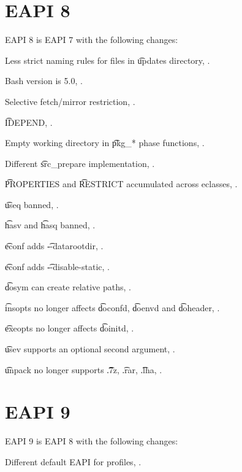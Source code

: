 \section*{EAPI 8}

EAPI 8 is EAPI 7 with the following changes:

\begin{compactitem}
\item Less strict naming rules for files in \t{updates} directory, .
\item Bash version is 5.0, .
\item Selective fetch/mirror restriction, .
\item \t{IDEPEND}, .
\item Empty working directory in \t{pkg_*} phase functions, .
\item Different \t{src_prepare} implementation, .
\item \t{PROPERTIES} and \t{RESTRICT} accumulated across eclasses, .
\item \t{useq} banned, .
\item \t{hasv} and \t{hasq} banned, .
\item \t{econf} adds \t{-{}-datarootdir}, .
\item \t{econf} adds \t{-{}-disable-static}, .
\item \t{dosym} can create relative paths, .
\item \t{insopts} no longer affects \t{doconfd}, \t{doenvd} and \t{doheader}, .
\item \t{exeopts} no longer affects \t{doinitd}, .
\item \t{usev} supports an optional second argument, .
\item \t{unpack} no longer supports \t{.7z}, \t{.rar}, \t{.lha}, .
\end{compactitem}

\section*{EAPI 9}

EAPI 9 is EAPI 8 with the following changes:

\begin{compactitem}
\item Different default EAPI for profiles, .
\end{compactitem}



